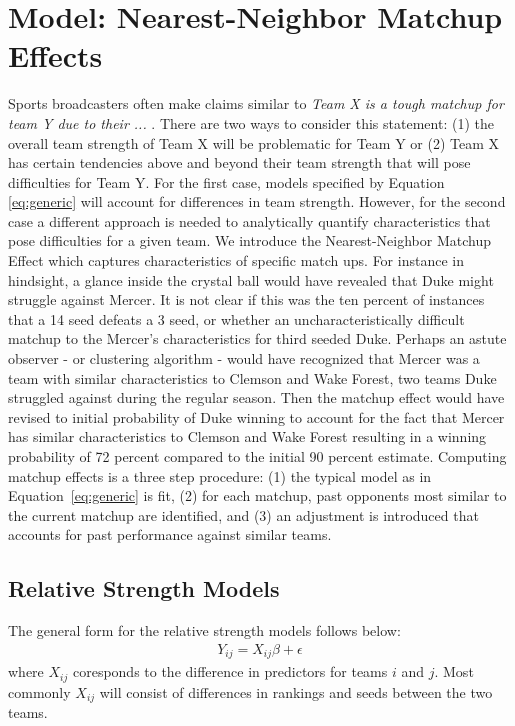 \section{Model: Nearest-Neighbor Matchup Effects}
Sports broadcasters often make claims similar to \emph{Team X is a tough matchup for team Y due to their ... }.  There are two ways to consider this statement: (1) the overall team strength of Team X will be problematic for Team Y or (2) Team X has certain tendencies above and beyond their team strength that will pose difficulties for Team Y.  For the first case, models specified by Equation \ref{eq:generic} will account for differences in team strength.  However, for the second case a different approach is needed to analytically quantify characteristics that pose difficulties for a given team.  We introduce the Nearest-Neighbor Matchup Effect which captures characteristics of specific match ups.  For instance in hindsight, a glance inside the crystal ball would have revealed that Duke might struggle against Mercer.  It is not clear if this was the ten percent of instances that a 14 seed defeats a 3 seed,  or whether an uncharacteristically difficult matchup to the Mercer's characteristics for third seeded Duke.  Perhaps an astute observer - or clustering algorithm - would have recognized that Mercer was a team with similar characteristics to Clemson and Wake Forest, two teams Duke struggled against during the regular season. Then the matchup effect would have revised to initial probability of Duke winning to account for the fact that Mercer has similar characteristics to Clemson and Wake Forest resulting in a winning probability of 72 percent compared to the initial 90 percent estimate.  Computing matchup effects is a three step procedure: (1)  the typical model as in Equation~\ref{eq:generic} is fit, (2) for each matchup, past opponents most similar to the current matchup are identified, and (3) an adjustment is introduced that accounts for past performance against similar teams. 
\subsection{Relative Strength Models}
The general form for the relative strength models follows below:
\begin{eqnarray}
Y_{ij} = X_{ij} \beta + \epsilon
\label{eq:ME}
\end{eqnarray}
where $X_{ij}$ coresponds to the difference in predictors for teams $i$ and $j.$  Most commonly $X_{ij}$ will consist of differences in rankings and seeds between the two teams. 

